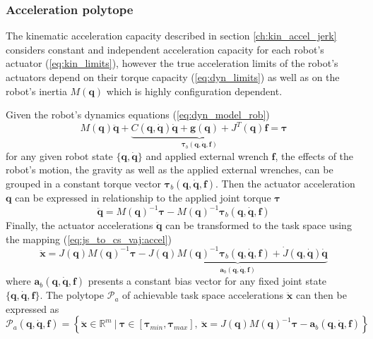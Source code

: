 \subsubsection{Acceleration polytope}
\label{ch:accel_poly_robot}

The kinematic acceleration capacity described in section \ref{ch:kin_accel_jerk} considers constant and independent acceleration capacity for each robot's actuator (\ref{eq:kin_limits}), however the true acceleration limits of the robot's actuators depend on their torque capacity (\ref{eq:dyn_limits}) as well as on the robot's inertia 
$M(\bm{q})$ which is highly configuration dependent. 

Given the robot's dynamics equations (\ref{eq:dyn_model_rob}) 
\begin{equation}
M(\bm{q})\ddot{\bm{q}} + \underbrace{C(\bm{q},\dot{\bm{q}})\dot{\bm{q}} + \bm{g}(\bm{q}) + J^T(\bm{q})\bm{f}}_{\bm{\tau}_b(\bm{q},\dot{\bm{q}},\bm{f}) } = \bm{\tau} 
\end{equation}
for any given robot state $\{\bm{q},\dot{\bm{q}}\}$ and applied external wrench $\bm{f}$, the effects of the robot's motion, the gravity as well as the applied external wrenches, can be grouped in a constant torque vector $\bm{\tau}_b(\bm{q},\dot{\bm{q}},\bm{f})$. Then the actuator acceleration $\bm{q}$ can be expressed in relationship to the applied joint torque $\bm{\tau}$
\begin{equation}
    \ddot{\bm{q}} = M(\bm{q})^{-1}\bm{\tau} - M(\bm{q})^{-1}\bm{\tau}_b(\bm{q},\dot{\bm{q}},\bm{f})
\end{equation}
Finally, the actuator accelerations $\ddot{\bm{q}}$ can be transformed to the task space using the mapping (\ref{eq:js_to_cs_vaj:accel})
\begin{equation}
    \ddot{\bm{x}} = J(\bm{q})M(\bm{q})^{-1}\bm{\tau} - \underbrace{J(\bm{q})M(\bm{q})^{-1}\bm{\tau}_b(\bm{q},\dot{\bm{q}},\bm{f}) + \dot{J}(\bm{q}, \dot{\bm{q}})\dot{\bm{q}}}_{\bm{a}_b(\bm{q},\dot{\bm{q}},\bm{f})}
\end{equation}
where $\bm{a}_b(\bm{q},\dot{\bm{q}},\bm{f})$ presents a constant bias vector for any fixed joint state $\{\bm{q},\dot{\bm{q}},\bm{f}\}$. The polytope $\mathcal{P}_a$ of achievable task space accelerations $\ddot{\bm{x}}$ can then be expressed as
\begin{equation}
    \mathcal{P}_a(\bm{q},\dot{\bm{q}},\bm{f}) = \left\{ \ddot{\bm{x}} \in \mathbb{R}^m ~|~ \bm{\tau}\in\left[\bm{\tau}_{min}, \bm{\tau}_{max} \right], ~ \ddot{\bm{x}} = J(\bm{q})M(\bm{q})^{-1}\bm{\tau} - \bm{a}_b(\bm{q},\dot{\bm{q}},\bm{f}) \right\}
    \label{eq:pol_accleration_rob}
\end{equation}

